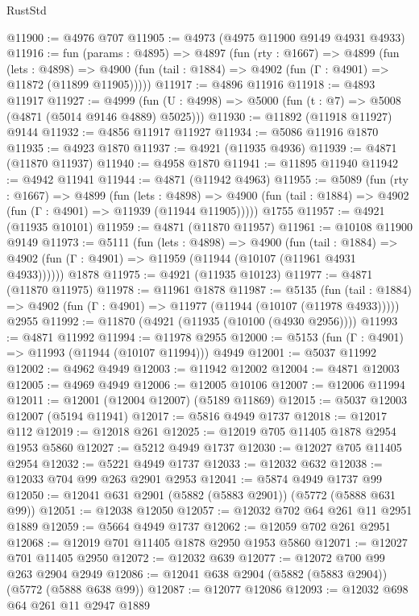 \begin{lexlean}{RustStd}
\begin{coremodule}
{\begin{coremodule}
{{{{{{{{{{{{{{{{{{{{{{{{{{{{{@11900 := @4976 @707
@11905 := @4973 (@4975 @11900 @9149 @4931 @4933)
@11916 := fun (params : @4895) =>
  @4897
    (fun (rty : @1667) =>
    @4899
      (fun (lets : @4898) =>
      @4900 (fun (tail : @1884) => @4902 (fun (Γ : @4901) => @11872 (@11899 @11905)))))
@11917 := @4896 @11916
@11918 := @4893 @11917
@11927 := @4999 (fun (U : @4998) => @5000 (fun (t : @7) => @5008 (@4871 (@5014 @9146 @4889) @5025)))
@11930 := @11892 (@11918 @11927) @9144
@11932 := @4856 @11917 @11927
@11934 := @5086 @11916 @1870
@11935 := @4923 @1870
@11937 := @4921 (@11935 @4936)
@11939 := @4871 (@11870 @11937)
@11940 := @4958 @1870
@11941 := @11895 @11940
@11942 := @4942 @11941
@11944 := @4871 (@11942 @4963)
@11955 := @5089
    (fun (rty : @1667) =>
    @4899
      (fun (lets : @4898) =>
      @4900 (fun (tail : @1884) => @4902 (fun (Γ : @4901) => @11939 (@11944 @11905)))))
    @1755
@11957 := @4921 (@11935 @10101)
@11959 := @4871 (@11870 @11957)
@11961 := @10108 @11900 @9149
@11973 := @5111
    (fun (lets : @4898) =>
    @4900
      (fun (tail : @1884) =>
      @4902 (fun (Γ : @4901) => @11959 (@11944 (@10107 (@11961 @4931 @4933))))))
    @1878
@11975 := @4921 (@11935 @10123)
@11977 := @4871 (@11870 @11975)
@11978 := @11961 @1878
@11987 := @5135
    (fun (tail : @1884) => @4902 (fun (Γ : @4901) => @11977 (@11944 (@10107 (@11978 @4933)))))
    @2955
@11992 := @11870 (@4921 (@11935 (@10100 (@4930 @2956))))
@11993 := @4871 @11992
@11994 := @11978 @2955
@12000 := @5153 (fun (Γ : @4901) => @11993 (@11944 (@10107 @11994))) @4949
@12001 := @5037 @11992
@12002 := @4962 @4949
@12003 := @11942 @12002
@12004 := @4871 @12003
@12005 := @4969 @4949
@12006 := @12005 @10106
@12007 := @12006 @11994
@12011 := @12001 (@12004 @12007) (@5189 @11869)
@12015 := @5037 @12003 @12007 (@5194 @11941)
@12017 := @5816 @4949 @1737
@12018 := @12017 @112
@12019 := @12018 @261
@12025 := @12019 @705 @11405 @1878 @2954 @1953 @5860
@12027 := @5212 @4949 @1737
@12030 := @12027 @705 @11405 @2954
@12032 := @5221 @4949 @1737
@12033 := @12032 @632
@12038 := @12033 @704 @99 @263 @2901 @2953
@12041 := @5874 @4949 @1737 @99
@12050 := @12041 @631 @2901 (@5882 (@5883 @2901)) (@5772 (@5888 @631 @99))
@12051 := @12038 @12050
@12057 := @12032 @702 @64 @261 @11 @2951 @1889
@12059 := @5664 @4949 @1737
@12062 := @12059 @702 @261 @2951
@12068 := @12019 @701 @11405 @1878 @2950 @1953 @5860
@12071 := @12027 @701 @11405 @2950
@12072 := @12032 @639
@12077 := @12072 @700 @99 @263 @2904 @2949
@12086 := @12041 @638 @2904 (@5882 (@5883 @2904)) (@5772 (@5888 @638 @99))
@12087 := @12077 @12086
@12093 := @12032 @698 @64 @261 @11 @2947 @1889
}}}}}}}}}}}}}}}}}}}}}}}}}}}}}
\end{coremodule}}
\end{coremodule}
\end{lexlean}
